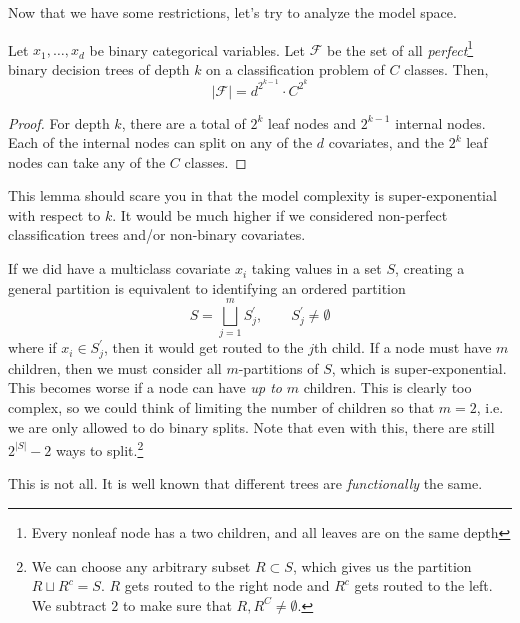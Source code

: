   Now that we have some restrictions, let's try to analyze the model space.   

  \begin{lemma}
    Let $x_1, \ldots, x_d$ be binary categorical variables. Let $\mathcal{F}$ be the set of all \textit{perfect}\footnote{Every nonleaf node has a two children, and all leaves are on the same depth} binary decision trees of depth $k$ on a classification problem of $C$ classes. Then, 
    \begin{equation}
      |\mathcal{F}| = d^{2^{k-1}} \cdot C^{2^{k}}
    \end{equation}
  \end{lemma}
  \begin{proof}
    For depth $k$, there are a total of $2^k$ leaf nodes and $2^{k-1}$ internal nodes. Each of the internal nodes can split on any of the $d$ covariates, and the $2^k$ leaf nodes can take any of the $C$ classes. 
  \end{proof}

  This lemma should scare you in that the model complexity is super-exponential with respect to $k$. It would be much higher if we considered non-perfect classification trees and/or non-binary covariates. 

  \begin{example}
    If we did have a multiclass covariate $x_i$ taking values in a set $S$, creating a general partition is equivalent to identifying an ordered partition 
    \begin{equation}
      S = \bigsqcup_{j=1}^m S^\prime_j, \qquad S^\prime_j \neq \emptyset
    \end{equation} 
    where if $x_i \in S^\prime_j$, then it would get routed to the $j$th child. If a node must have $m$ children, then we must consider all $m$-partitions of $S$, which is super-exponential. This becomes worse if a node can have \textit{up to} $m$ children. This is clearly too complex, so we could think of limiting the number of children so that $m = 2$, i.e. we are only allowed to do binary splits. Note that even with this, there are still $2^{|S|} - 2$ ways to split.\footnote{We can choose any arbitrary subset $R \subset S$, which gives us the partition $R \sqcup R^c = S$. $R$ gets routed to the right node and $R^c$ gets routed to the left. We subtract $2$ to make sure that $R, R^C \neq \emptyset$.}
  \end{example}

  This is not all. It is well known that different trees are \textit{functionally} the same. 

